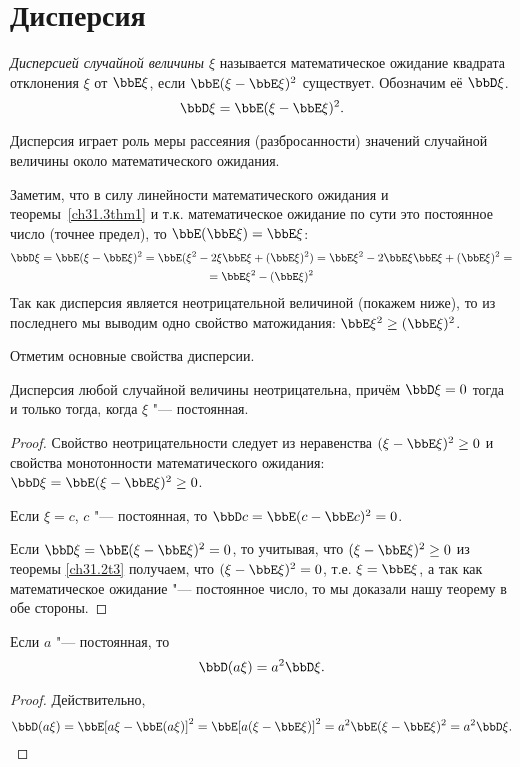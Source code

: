 \section{Дисперсия}
\begin{defn}
\textit{Дисперсией случайной величины $\xi$} называется математическое ожидание квадрата отклонения $\xi$ от $\bbE\xi$, если $\bbE(\xi-\bbE\xi)^2$ существует. Обозначим её $\bbD\xi$. 
\begin{equation} \label{ch31.4eq1}
\bbD\xi=\bbE(\xi-\bbE\xi)^2.
\end{equation}
\end{defn}

Дисперсия играет роль меры рассеяния (разбросанности) значений случайной величины около математического ожидания.

Заметим, что в силу линейности математического ожидания и теоремы~\ref{ch31.3thm1}\; и т.к. математическое ожидание по сути это постоянное число (точнее предел), то $\bbE(\bbE\xi)=\bbE\xi$:
\begin{multline*}
\bbD\xi = \bbE(\xi-\bbE\xi)^2=\bbE(\xi^2-2\xi \bbE\xi+(\bbE\xi)^2)=\bbE\xi^2-2\bbE\xi \bbE\xi+(\bbE\xi)^2=\\=\bbE\xi^2-(\bbE\xi)^2
\end{multline*}
Так как дисперсия является неотрицательной величиной (покажем ниже), то из последнего мы выводим одно свойство матожидания: $\bbE\xi^2\ge(\bbE\xi)^2$.

Отметим основные свойства дисперсии.

\begin{thm} Дисперсия любой случайной величины неотрицательна, причём $\bbD\xi = 0$ тогда и только тогда, когда $\xi$ "--- постоянная. 
\end{thm}
\begin{proof}
Свойство неотрицательности следует из неравенства $(\xi - \bbE \xi)^2 \ge 0$ и свойства монотонности математического ожидания: $\bbD \xi = \bbE (\xi - \bbE \xi)^2 \ge 0$.

Если $\xi = c$, $c$ "--- постоянная, то $\bbD c = \bbE (c - \bbE c)^2 = 0$. 

Если $\bbD\xi=\bbE (\xi - \bbE \xi)^2=0$, то учитывая, что $(\xi - \bbE \xi)^2\ge 0$ из теоремы \ref{ch31.2t3} получаем, что $(\xi - \bbE \xi)^2=0$, т.е. $\xi=\bbE\xi$, а так как математическое ожидание "--- постоянное число, то мы доказали нашу теорему в обе стороны.
\end{proof}
\begin{thm} Если $a$ "--- постоянная, то $$\bbD(a\xi) = a^2 \bbD\xi.$$
\end{thm}
\begin{proof}
Действительно, 
\begin{equation*}
\bbD(a\xi) = \bbE[a\xi - \bbE (a\xi)]^2 = \bbE [a (\xi - \bbE \xi)]^2 = a^2\bbE(\xi - \bbE\xi)^2 = a^2 \bbD\xi. \qedhere
\end{equation*}
\end{proof}

